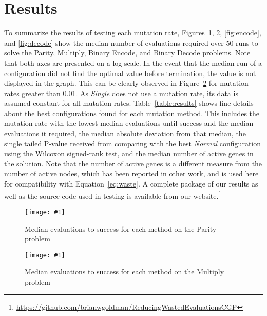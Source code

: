 \documentclass[runningheads,a4paper]{llncs}
\newcommand{\includegraphicsfit}[1]
{\texttt{[image: \#1]}}
\begin{document}
\section{Results}
To summarize the results of testing each mutation rate, Figures~\ref{fig:parity},
\ref{fig:multiply}, \ref{fig:encode}, and \ref{fig:decode} show the median number of evaluations
required over 50 runs to solve the Parity, Multiply, Binary Encode, and Binary Decode problems.  Note
that both axes are presented on a log scale.  In the event that the median run of a configuration
did not find the optimal value before termination, the value is not displayed in the graph.  This can be
clearly observed in Figure~\ref{fig:multiply} for mutation rates greater than 0.01.  As \emph{Single}
does not use a mutation rate, its data is assumed constant for all mutation rates.
%
Table~\ref{table:results} shows fine details
about the best configurations found for each mutation method.  This includes the mutation rate
with the lowest median evaluations until success and the median evaluations it required, the median absolute
deviation from that median, the single tailed P-value received from comparing with the best \emph{Normal}
configuration using the Wilcoxon signed-rank test, and the median number of active genes in the solution.
Note that the number of active genes is a different measure from the number of active nodes, which has
been reported in other work, and is used here for compatibility with Equation~\ref{eq:waste}.
%
A complete package of our results as well as the source code used in testing
is available from our website.\footnote{\url{https://github.com/brianwgoldman/ReducingWastedEvaluationsCGP}}

\begin{figure}
  \centering
  \includegraphicsfit{parity}
  \caption{Median evaluations to success for each method on the Parity problem} 
  \label{fig:parity}
\end{figure}

\begin{figure}
  \centering
  \includegraphicsfit{multiply}
  \caption{Median evaluations to success for each method on the Multiply problem} 
  \label{fig:multiply}
\end{figure}

\begin{comment}
\begin{figure}
  \centering
  \includegraphicsfit{quartic}
  \caption{Mean Evaluations to Success for each method on the Quartic problem} 
  \label{fig:quartic}
\end{figure}
\end{comment}
\end{document}
